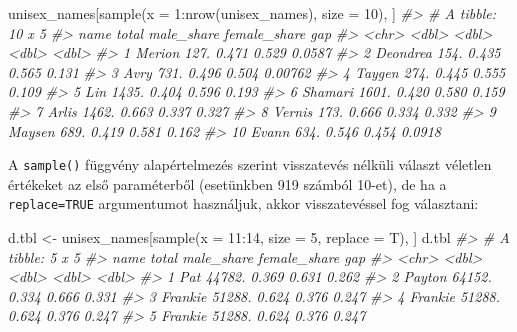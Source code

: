 \documentclass[
]{book}
\newenvironment{Shaded}{\begin{snugshade}}{\end{snugshade}}
\newcommand{\AttributeTok}[1]{\textcolor[rgb]{0.77,0.63,0.00}{#1}}
\newcommand{\CommentTok}[1]{\textcolor[rgb]{0.56,0.35,0.01}{\textit{#1}}}
\newcommand{\DecValTok}[1]{\textcolor[rgb]{0.00,0.00,0.81}{#1}}
\newcommand{\FunctionTok}[1]{\textcolor[rgb]{0.00,0.00,0.00}{#1}}
\newcommand{\NormalTok}[1]{#1}
\newcommand{\OtherTok}[1]{\textcolor[rgb]{0.56,0.35,0.01}{#1}}
\newcommand{\SpecialCharTok}[1]{\textcolor[rgb]{0.00,0.00,0.00}{#1}}
\begin{document}
\begin{Shaded}
\begin{Highlighting}[]
\NormalTok{unisex\_names[}\FunctionTok{sample}\NormalTok{(}\AttributeTok{x =} \DecValTok{1}\SpecialCharTok{:}\FunctionTok{nrow}\NormalTok{(unisex\_names), }\AttributeTok{size =} \DecValTok{10}\NormalTok{), ]}
\CommentTok{\#\textgreater{} \# A tibble: 10 x 5}
\CommentTok{\#\textgreater{}    name     total male\_share female\_share     gap}
\CommentTok{\#\textgreater{}    \textless{}chr\textgreater{}    \textless{}dbl\textgreater{}      \textless{}dbl\textgreater{}        \textless{}dbl\textgreater{}   \textless{}dbl\textgreater{}}
\CommentTok{\#\textgreater{}  1 Merion    127.      0.471        0.529 0.0587 }
\CommentTok{\#\textgreater{}  2 Deondrea  154.      0.435        0.565 0.131  }
\CommentTok{\#\textgreater{}  3 Avry      731.      0.496        0.504 0.00762}
\CommentTok{\#\textgreater{}  4 Taygen    274.      0.445        0.555 0.109  }
\CommentTok{\#\textgreater{}  5 Lin      1435.      0.404        0.596 0.193  }
\CommentTok{\#\textgreater{}  6 Shamari  1601.      0.420        0.580 0.159  }
\CommentTok{\#\textgreater{}  7 Arlis    1462.      0.663        0.337 0.327  }
\CommentTok{\#\textgreater{}  8 Vernis    173.      0.666        0.334 0.332  }
\CommentTok{\#\textgreater{}  9 Maysen    689.      0.419        0.581 0.162  }
\CommentTok{\#\textgreater{} 10 Evann     634.      0.546        0.454 0.0918}
\end{Highlighting}
\end{Shaded}

A \texttt{sample()} függvény alapértelmezés szerint visszatevés nélküli választ véletlen értékeket az első paraméterből (esetünkben 919 számból 10-et), de ha a \texttt{replace=TRUE} argumentumot használjuk, akkor visszatevéssel fog választani:

\begin{Shaded}
\begin{Highlighting}[]
\NormalTok{d.tbl }\OtherTok{\textless{}{-}}\NormalTok{ unisex\_names[}\FunctionTok{sample}\NormalTok{(}\AttributeTok{x =} \DecValTok{11}\SpecialCharTok{:}\DecValTok{14}\NormalTok{, }\AttributeTok{size =} \DecValTok{5}\NormalTok{, }\AttributeTok{replace =}\NormalTok{ T), ]}
\NormalTok{d.tbl}
\CommentTok{\#\textgreater{} \# A tibble: 5 x 5}
\CommentTok{\#\textgreater{}   name     total male\_share female\_share   gap}
\CommentTok{\#\textgreater{}   \textless{}chr\textgreater{}    \textless{}dbl\textgreater{}      \textless{}dbl\textgreater{}        \textless{}dbl\textgreater{} \textless{}dbl\textgreater{}}
\CommentTok{\#\textgreater{} 1 Pat     44782.      0.369        0.631 0.262}
\CommentTok{\#\textgreater{} 2 Payton  64152.      0.334        0.666 0.331}
\CommentTok{\#\textgreater{} 3 Frankie 51288.      0.624        0.376 0.247}
\CommentTok{\#\textgreater{} 4 Frankie 51288.      0.624        0.376 0.247}
\CommentTok{\#\textgreater{} 5 Frankie 51288.      0.624        0.376 0.247}
\end{Highlighting}
\end{Shaded}
\end{document}
